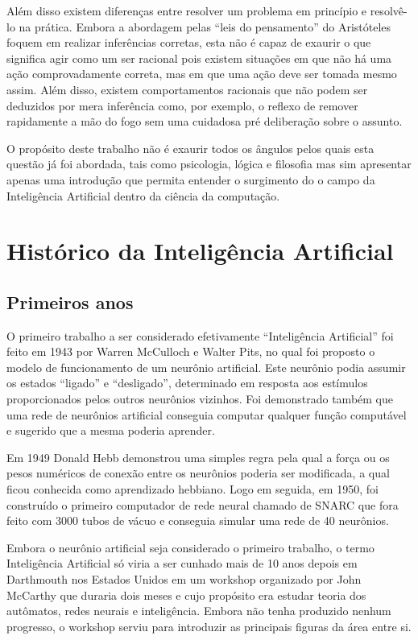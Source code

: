 Além disso existem diferenças entre resolver um problema em princípio e
resolvê-lo na prática. Embora a abordagem pelas ``leis do pensamento'' do
Aristóteles foquem em realizar inferências corretas, esta não é capaz de
exaurir o que significa agir como um ser racional pois existem situações em que
não há uma ação comprovadamente correta, mas em que uma ação deve ser tomada
mesmo assim. Além disso, existem comportamentos racionais que não podem ser
deduzidos por mera inferência como, por exemplo, o reflexo de remover
rapidamente a mão do fogo sem uma cuidadosa pré deliberação sobre o assunto.

O propósito deste trabalho não é exaurir todos os ângulos pelos quais esta
questão já foi abordada, tais como psicologia, lógica e filosofia mas sim
apresentar apenas uma introdução que permita entender o surgimento do o campo da
Inteligência Artificial dentro da ciência da computação.

\section{Histórico da Inteligência Artificial}

\subsection{Primeiros anos}

O primeiro trabalho a ser considerado efetivamente ``Inteligência Artificial''
foi feito em 1943 por Warren McCulloch e Walter Pits, no qual foi proposto o
modelo de funcionamento de um neurônio artificial.  Este neurônio podia assumir
os estados ``ligado'' e ``desligado'', determinado em resposta aos estímulos
proporcionados pelos outros neurônios vizinhos. Foi demonstrado também que uma
rede de neurônios artificial conseguia computar qualquer função computável e
sugerido que a mesma poderia aprender.

Em 1949 Donald Hebb demonstrou uma simples regra pela qual a força ou os pesos
numéricos de conexão entre os neurônios poderia ser modificada, a qual ficou
conhecida como aprendizado hebbiano. Logo em seguida, em 1950, foi construído o
primeiro computador de rede neural chamado de SNARC que fora feito com 3000
tubos de vácuo e conseguia simular uma rede de 40 neurônios.

Embora o neurônio artificial seja considerado o primeiro trabalho, o termo
Inteligência Artificial só viria a ser cunhado mais de 10 anos depois em
Darthmouth nos Estados Unidos em um workshop organizado por John McCarthy que
duraria dois meses e cujo propósito era estudar teoria dos autômatos, redes
neurais e inteligência. Embora não tenha produzido nenhum progresso, o workshop
serviu para introduzir as principais figuras da área entre si.

